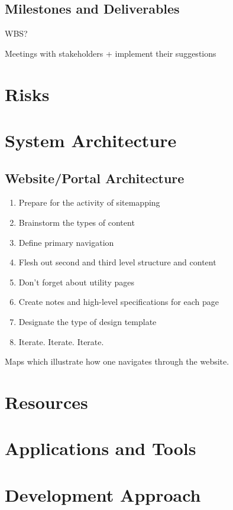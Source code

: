 \documentclass[12pt,onecolumn]{IEEEtran}
\begin{document}
\subsection{Milestones and Deliverables} \label{sec:MilestonesAndDeliverables}
WBS?

Meetings with stakeholders + implement their suggestions


\section{Risks} \label{sec:Risks}

\section{System Architecture} \label{sec:SystemArchitecture}

\subsection{Website/Portal Architecture} \label{sec:WebsiteArchitecture}

\begin{enumerate}
\item Prepare for the activity of sitemapping
\item Brainstorm the types of content
\item Define primary navigation
\item Flesh out second and third level structure and content
\item Don’t forget about utility pages
\item Create notes and high-level specifications for each page
\item Designate the type of design template
\item Iterate. Iterate. Iterate.
\end{enumerate}

Maps which illustrate how one navigates through the website. 

\section{Resources} \label{sec:Resources}

\section{Applications and Tools} \label{sec:ApplicationsAndTools}

\section{Development Approach} \label{sec:Development Approach}
\end{document}
